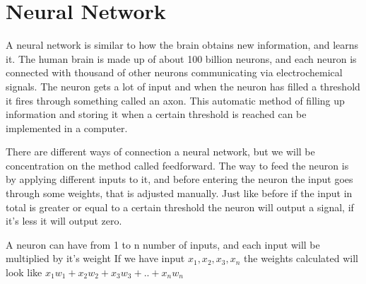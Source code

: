 \section{Neural Network}

A neural network is similar to how the brain obtains new information, and learns it. The human brain is made up of about 100 billion neurons, and each neuron is connected with thousand of other neurons communicating via electrochemical signals. The neuron gets a lot of input and when the neuron has filled a threshold it fires through something called an axon. This automatic method of filling up information and storing it when a certain threshold is reached can be implemented in a computer.



There are different ways of connection a neural network, but we will be concentration on the method called feedforward. The way to feed the neuron is by applying different inputs to it, and before entering the neuron the input goes through some weights, that is adjusted manually. Just like before if the input in total is greater or equal to a certain threshold the neuron will output a signal, if it's less it will output zero.


A neuron can have from 1 to n number of inputs, and each input will be multiplied by it's weight
If we have input $x_1, x_2, x_3, x_n$ the weights calculated will look like $x_1 w_1 + x_2 w_2 + x_3 w_3 + .. +  x_n w_n$



